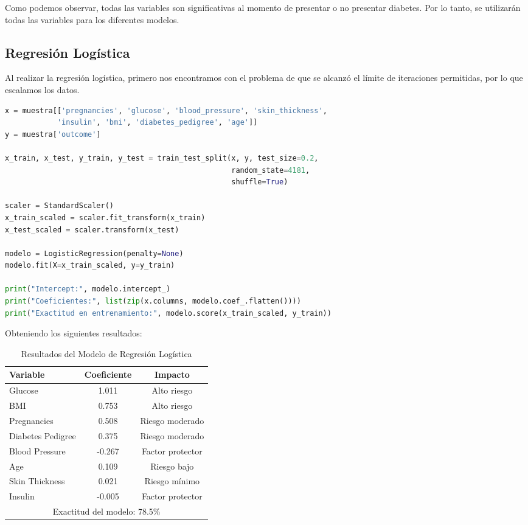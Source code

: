\documentclass[12pt,a4paper]{article}
\begin{document}
Como podemos observar, todas las variables son significativas al momento de presentar o no presentar diabetes. Por lo tanto, se utilizarán todas las variables para los diferentes modelos.

\vspace{0.5cm}

\subsection{Regresión Logística}

Al realizar la regresión logística, primero nos encontramos con el problema de que se alcanzó el límite de iteraciones permitidas, por lo que escalamos los datos.

\begin{lstlisting}[language=Python, frame=single, basicstyle=\ttfamily\small, breaklines=true]
x = muestra[['pregnancies', 'glucose', 'blood_pressure', 'skin_thickness',
            'insulin', 'bmi', 'diabetes_pedigree', 'age']]
y = muestra['outcome']

x_train, x_test, y_train, y_test = train_test_split(x, y, test_size=0.2, 
                                                    random_state=4181, 
                                                    shuffle=True)

scaler = StandardScaler()
x_train_scaled = scaler.fit_transform(x_train)
x_test_scaled = scaler.transform(x_test)

modelo = LogisticRegression(penalty=None)
modelo.fit(X=x_train_scaled, y=y_train)

print("Intercept:", modelo.intercept_)
print("Coeficientes:", list(zip(x.columns, modelo.coef_.flatten())))
print("Exactitud en entrenamiento:", modelo.score(x_train_scaled, y_train))
\end{lstlisting}

Obteniendo los siguientes resultados:

\vspace{0.3cm}

\begin{table}[H]
\centering
\caption{Resultados del Modelo de Regresión Logística}\label{tab:regresion_resultados}
\begin{tabular}{lcc}
\toprule
\textbf{Variable} & \textbf{Coeficiente} & \textbf{Impacto} \\
\midrule
Glucose & 1.011 & Alto riesgo \\
BMI & 0.753 & Alto riesgo \\
Pregnancies & 0.508 & Riesgo moderado \\
Diabetes Pedigree & 0.375 & Riesgo moderado \\
Blood Pressure & -0.267 & Factor protector \\
Age & 0.109 & Riesgo bajo \\
Skin Thickness & 0.021 & Riesgo mínimo \\
Insulin & -0.005 & Factor protector \\
\midrule
\multicolumn{3}{c}{Exactitud del modelo: 78.5\%} \\
\bottomrule
\end{tabular}
\end{table}
\end{document}
